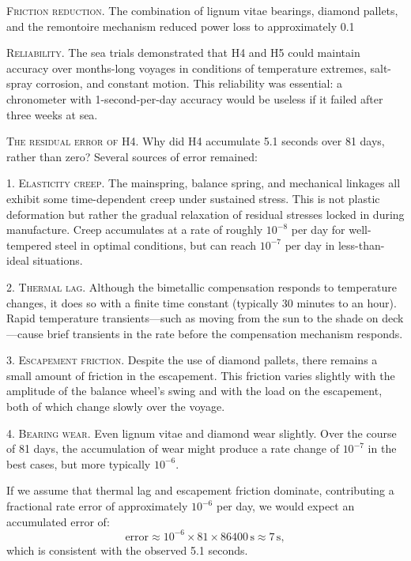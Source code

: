\textsc{Friction reduction.} The combination of lignum vitae bearings, diamond pallets, and the remontoire mechanism reduced power loss to approximately 0.1%

\textsc{Reliability.} The sea trials demonstrated that H4 and H5 could maintain accuracy over months-long voyages in conditions of temperature extremes, salt-spray corrosion, and constant motion. This reliability was essential: a chronometer with 1-second-per-day accuracy would be useless if it failed after three weeks at sea.

\textsc{The residual error of H4.} Why did H4 accumulate 5.1 seconds over 81 days, rather than zero? Several sources of error remained:

1. \textsc{Elasticity creep.} The mainspring, balance spring, and mechanical linkages all exhibit some time-dependent creep under sustained stress. This is not plastic deformation but rather the gradual relaxation of residual stresses locked in during manufacture. Creep accumulates at a rate of roughly $10^{-8}$ per day for well-tempered steel in optimal conditions, but can reach $10^{-7}$ per day in less-than-ideal situations.

2. \textsc{Thermal lag.} Although the bimetallic compensation responds to temperature changes, it does so with a finite time constant (typically 30 minutes to an hour). Rapid temperature transients—such as moving from the sun to the shade on deck—cause brief transients in the rate before the compensation mechanism responds.

3. \textsc{Escapement friction.} Despite the use of diamond pallets, there remains a small amount of friction in the escapement. This friction varies slightly with the amplitude of the balance wheel's swing and with the load on the escapement, both of which change slowly over the voyage.

4. \textsc{Bearing wear.} Even lignum vitae and diamond wear slightly. Over the course of 81 days, the accumulation of wear might produce a rate change of $10^{-7}$ in the best cases, but more typically $10^{-6}$.

If we assume that thermal lag and escapement friction dominate, contributing a fractional rate error of approximately $10^{-6}$ per day, we would expect an accumulated error of:
\[
  \text{error} \approx 10^{-6} \times 81 \times 86400 \, \text{s} \approx 7 \, \text{s},
\]
which is consistent with the observed 5.1 seconds.

